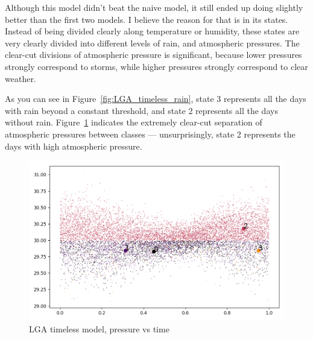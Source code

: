 \documentclass[a4paper]{article}
\begin{document}
Although this model didn't beat the naive model, it still ended up doing slightly better than the first two models. I believe the reason for that is in its states. Instead of being divided clearly along temperature or humidity, these states are very clearly divided into different levels of rain, and atmospheric pressures. The clear-cut divisions of atmospheric pressure is significant, because lower pressures strongly correspond to storms, while higher pressures strongly correspond to clear weather. 

As you can see in Figure~\ref{fig:LGA_timeless_rain}, state 3 represents all the days with rain beyond a constant threshold, and state 2 represents all the days without rain. Figure~\ref{fig:LGA_timeless_pressure} indicates the extremely clear-cut separation of atmospheric pressures between classes --- unsurprisingly, state 2 represents the days with high atmospheric pressure.


\begin{figure}[t]
  \centering
  \includegraphics[width=\linewidth]{../png/models/LGA-timeless-pressure4.png}
  \caption{LGA timeless model, pressure vs time}
  \label{fig:LGA_timeless_pressure}
\end{figure}
\end{document}
